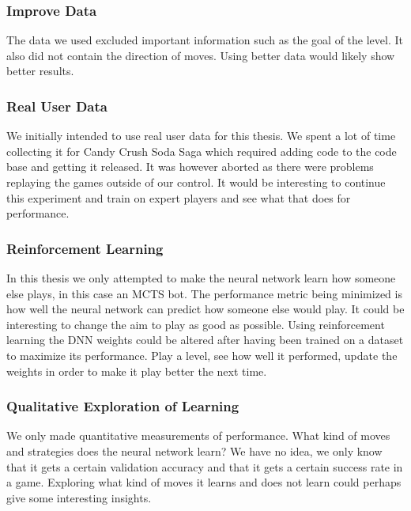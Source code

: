\documentclass{kththesis}
\begin{document}
\subsubsection{Improve Data}
The data we used excluded important information such as the goal of the level. It also did not contain the direction of moves. Using better data would likely show better results.

\subsubsection{Real User Data}
We initially intended to use real user data for this thesis. We spent a lot of time collecting  it for Candy Crush Soda Saga which required adding code to the code base and getting it released.  It was however aborted as there were problems replaying the games outside of our control. It would be interesting to continue this experiment and train on expert players and see what that does for performance.

\subsubsection{Reinforcement Learning}
In this thesis we only attempted to make the neural network learn how someone else plays, in this case an MCTS bot. The performance metric being minimized is how well the neural network can predict how someone else would play. It could be interesting to change the aim to play as good as possible. Using reinforcement learning the DNN weights could be altered after having been trained on a dataset to maximize its performance. Play a level, see how well it performed, update the weights in order to make it play better the next time. 

\subsubsection{Qualitative Exploration of Learning}
We only made quantitative measurements of performance. What kind of moves and strategies does the neural network learn? We have no idea, we only know that it gets a certain validation accuracy and that it gets a certain success rate in a game. Exploring what kind of moves  it learns and does not learn could perhaps give some interesting insights.






\end{document}
